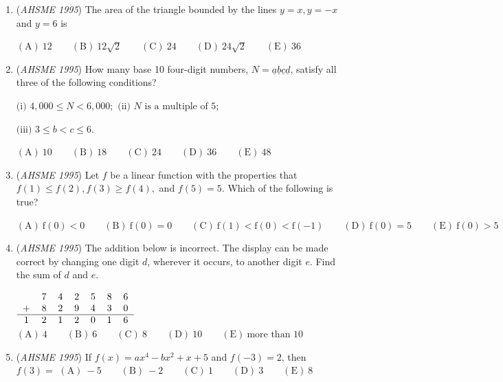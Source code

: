 \begin{enumerate}
$\mathrm{(A) \ 10 } \qquad \mathrm{(B) \ 12 } \qquad \mathrm{(C) \ 14 } \qquad \mathrm{(D) \ 16 } \qquad \mathrm{(E) \ 18 }$


	\item (\textit{AHSME 1995}) The area of the triangle bounded by the lines $y = x, y = - x$ and $y = 6$ is


 $\mathrm{(A) \ 12 } \qquad \mathrm{(B) \ 12\sqrt{2} } \qquad \mathrm{(C) \ 24 } \qquad \mathrm{(D) \ 24\sqrt{2} } \qquad \mathrm{(E) \ 36 }$


	\item (\textit{AHSME 1995}) How many base 10 four-digit numbers, $N = \underline{a} \underline{b} \underline{c} \underline{d}$, satisfy all three of the following conditions?


 $\text{(i)}$ $4,000 \leq N < 6,000;$
$\text{(ii)}$ $N$ $\text{is a multiple of 5}$; 


 $\text{(iii)}$ $3 \leq b < c \leq 6$.


 

$\mathrm{(A) \ 10 } \qquad \mathrm{(B) \ 18 } \qquad \mathrm{(C) \ 24 } \qquad \mathrm{(D) \ 36 } \qquad \mathrm{(E) \ 48 }$


	\item (\textit{AHSME 1995}) Let $f$ be a linear function with the properties that $f(1) \leq f(2), f(3) \geq f(4),$ and $f(5) = 5$. Which of the following is true?


 $\mathrm{(A) \ f(0) < 0 } \qquad \mathrm{(B) \ f(0) = 0 } \qquad \mathrm{(C) \ f(1) < f(0) < f( - 1) } \qquad \mathrm{(D) \ f(0) = 5 } \qquad \mathrm{(E) \ f(0) > 5 }$


	\item (\textit{AHSME 1995}) The addition below is incorrect. The display can be made correct by changing one digit $d$, wherever it occurs, to another digit $e$. Find the sum of $d$ and $e$.


 $\begin{tabular}{ccccccc} & 7 & 4 & 2 & 5 & 8 & 6 \\ + & 8 & 2 & 9 & 4 & 3 & 0 \\ \hline 1 & 2 & 1 & 2 & 0 & 1 & 6 \end{tabular}$
$\mathrm{(A) \ 4 } \qquad \mathrm{(B) \ 6 } \qquad \mathrm{(C) \ 8 } \qquad \mathrm{(D) \ 10 } \qquad \mathrm{(E) \ \text{more than 10} }$


	\item (\textit{AHSME 1995}) If $f(x) = ax^4 - bx^2 + x + 5$ and $f( - 3) = 2$, then $f(3) =$
$\mathrm{(A) \ -5 } \qquad \mathrm{(B) \ -2 } \qquad \mathrm{(C) \ 1 } \qquad \mathrm{(D) \ 3 } \qquad \mathrm{(E) \ 8 }$



\end{enumerate}

